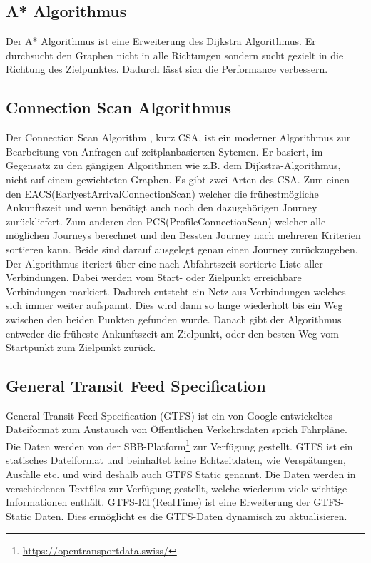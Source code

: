 \subsection{A* Algorithmus}
Der A* Algorithmus \cite{dij_a} ist eine Erweiterung des Dijkstra Algorithmus. Er durchsucht den Graphen nicht in alle Richtungen sondern sucht gezielt in die Richtung des Zielpunktes. Dadurch lässt sich die Performance verbessern.

\subsection{Connection Scan Algorithmus}
Der Connection Scan Algorithm \cite{csa} , kurz CSA,  ist ein moderner Algorithmus zur Bearbeitung von Anfragen auf zeitplanbasierten Sytemen. Er basiert, im Gegensatz zu den gängigen Algorithmen wie z.B. dem Dijkstra-Algorithmus, nicht auf einem gewichteten Graphen. 
Es gibt zwei Arten des CSA. Zum einen den EACS(EarlyestArrivalConnectionScan) welcher die frühestmögliche Ankunftszeit und wenn benötigt auch noch den dazugehörigen Journey zurückliefert. Zum anderen den PCS(ProfileConnectionScan) welcher alle möglichen Journeys berechnet und den Bessten Journey nach mehreren Kriterien sortieren kann. Beide sind darauf ausgelegt genau einen Journey zurückzugeben.
Der Algorithmus iteriert über eine nach Abfahrtszeit sortierte Liste aller Verbindungen. Dabei werden vom Start- oder Zielpunkt erreichbare Verbindungen markiert. Dadurch entsteht ein Netz aus Verbindungen welches sich immer weiter aufspannt. Dies wird dann so lange wiederholt bis ein Weg zwischen den beiden Punkten gefunden wurde. Danach gibt der Algorithmus entweder die früheste Ankunftszeit am Zielpunkt, oder den besten Weg vom Startpunkt zum Zielpunkt zurück.




 

\subsection{General Transit Feed Specification}
General Transit Feed Specification (GTFS)\cite{gtfsinhalt}\cite{gtfs} ist ein von Google entwickeltes Dateiformat zum Austausch von Öffentlichen Verkehrsdaten sprich Fahrpläne. Die Daten werden von der SBB-Platform\footnote{\url{https://opentransportdata.swiss/}} zur Verfügung gestellt. GTFS ist ein statisches Dateiformat und beinhaltet keine Echtzeitdaten, wie Verspätungen, Ausfälle etc. und wird deshalb auch GTFS Static genannt. Die Daten werden in verschiedenen Textfiles zur Verfügung gestellt, welche wiederum viele wichtige Informationen enthält. GTFS-RT(RealTime) ist eine Erweiterung der GTFS-Static Daten. Dies ermöglicht es die GTFS-Daten dynamisch zu aktualisieren. \cite{gtfs-rt-google} \newline


